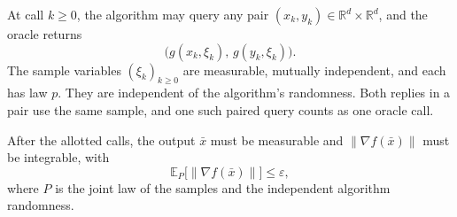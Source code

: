 \documentclass[10pt]{article}
\theoremstyle{definition}
\begin{document}
At call $k\geq0$, the algorithm may query any pair $(x_k,y_k)\in\mathbb{R}^d\times\mathbb{R}^d$, and the oracle returns
\[
\bigl(g(x_k,\xi_k),\,g(y_k,\xi_k)\bigr).
\]
The sample variables $(\xi_k)_{k\geq0}$ are measurable, mutually independent, and each has law $p$. They are independent of the algorithm's randomness. Both replies in a pair use the same sample, and one such paired query counts as one oracle call.

After the allotted calls, the output $\bar{x}$ must be measurable and $\|\nabla f(\bar{x})\|$ must be integrable, with
\[
\mathbb{E}_{P}\bigl[\|\nabla f(\bar{x})\|\bigr]\leq\varepsilon,
\]
where $P$ is the joint law of the samples and the independent algorithm randomness.
\end{document}
